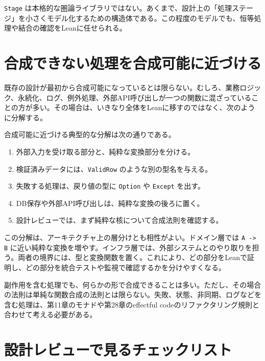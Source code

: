 \begin{leanbox}
\texttt{Stage} は本格的な圏論ライブラリではない。あくまで、設計上の「処理ステージ」を小さくモデル化するための構造体である。この程度のモデルでも、恒等処理や結合の確認をLeanに任せられる。
\end{leanbox}

\section{合成できない処理を合成可能に近づける}

既存の設計が最初から合成可能になっているとは限らない。むしろ、業務ロジック、永続化、ログ、例外処理、外部API呼び出しが一つの関数に混ざっていることの方が多い。その場合は、いきなり全体をLeanに移すのではなく、次のように分解する。

\begin{softwarebox}
合成可能に近づける典型的な分解は次の通りである。
\begin{enumerate}
\item 外部入力を受け取る部分と、純粋な変換部分を分ける。
\item 検証済みデータには、\texttt{ValidRow} のような別の型名を与える。
\item 失敗する処理は、戻り値の型に \texttt{Option} や \texttt{Except} を出す。
\item DB保存や外部API呼び出しは、純粋な変換の後ろに置く。
\item 設計レビューでは、まず純粋な核について合成法則を確認する。
\end{enumerate}
\end{softwarebox}

この分解は、アーキテクチャ上の層分けとも相性がよい。ドメイン層では \texttt{A -> B} に近い純粋な変換を増やす。インフラ層では、外部システムとのやり取りを担う。両者の境界には、型と変換関数を置く。これにより、どの部分をLeanで証明し、どの部分を統合テストや監視で確認するかを分けやすくなる。

\begin{warningbox}
副作用を含む処理でも、何らかの形で合成できることは多い。ただし、その場合の法則は単純な関数合成の法則とは限らない。失敗、状態、非同期、ログなどを含む処理は、第11章のモナドや第28章のeffectful codeのリファクタリング規則と合わせて考える必要がある。
\end{warningbox}

\section{設計レビューで見るチェックリスト}

